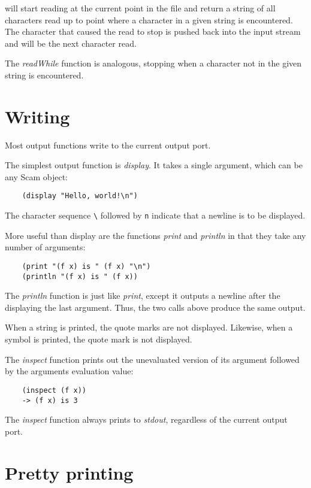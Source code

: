 will start reading at the current point in the file
and return a string of all characters read up to point
where a character in a given string is encountered.
The character that caused the read to stop is pushed
back into the input stream and will be the next character
read.

The {\it readWhile} function is analogous, stopping when
a character not in the given string is encountered.

\section{Writing}

Most output functions write to the current output port.

The simplest output function is {\it display}. It takes a single
argument, which can be any Scam object:

\begin{verbatim}
    (display "Hello, world!\n")
\end{verbatim}

The character sequence \verb!\! followed by
\verb!n! indicate that
a newline is to be displayed.

More useful than display are the functions {\it print} and
{\it println} in that they take any number of arguments:

\begin{verbatim}
    (print "(f x) is " (f x) "\n")
    (println "(f x) is " (f x))
\end{verbatim}

The {\it println} function is just like {\it print}, except it
outputs a newline after the displaying the last argument.
Thus, the two calls above produce the same output.

When a string is printed, the quote marks are not displayed.
Likewise, when a symbol is printed, the quote mark is not displayed.

The {\it inspect} function 
prints out the unevaluated
version of its argument followed by the arguments evaluation value:

\begin{verbatim}
    (inspect (f x))
    -> (f x) is 3
\end{verbatim}

The {\it inspect} function always prints to {\it stdout},
regardless of the current output port.

\section{Pretty printing}


